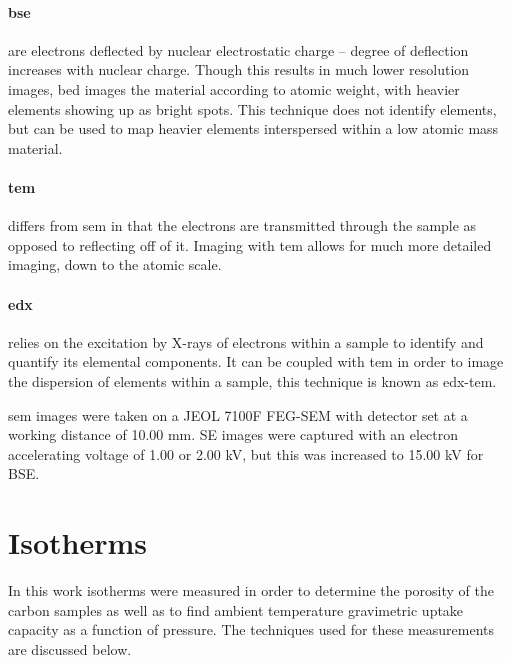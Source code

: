 \paragraph{\acrfull{bse}} are electrons deflected by nuclear electrostatic charge – degree of deflection increases with nuclear charge. Though this results in much lower resolution images, \acrfull{bed} images the material according to atomic weight, with heavier elements showing up as bright spots. This technique does not identify elements, but can be used to map heavier elements interspersed within a low atomic mass material.\citep{Goldstein2017Scanning}

\paragraph{\acrfull{tem}} differs from \acrshort{sem} in that the electrons are transmitted through the sample as opposed to reflecting off of it. Imaging with \acrshort{tem} allows for much more detailed imaging, down to the atomic scale.\citep{knoll1932elektronenmikroskop}

\paragraph{\acrfull{edx}} relies on the excitation by X-rays of electrons within a sample to identify and quantify its elemental components. It can be coupled with \acrshort{tem} in order to image the dispersion of elements within a sample, this technique is known as \acrshort{edx}-\acrshort{tem}.\citep{Goldstein2017Scanning}

\par \acrshort{sem} images were taken on a JEOL 7100F FEG-SEM with detector set at a working distance of 10.00 mm. SE images were captured with an electron accelerating voltage of 1.00 or 2.00 kV, but this was increased to 15.00 kV for BSE. %

\section{Isotherms}\label{s:porosimetry}

In this work isotherms were measured in order to determine the porosity of the carbon samples as well as to find ambient temperature gravimetric  uptake capacity as a function of pressure. The techniques used for these measurements are discussed below.

